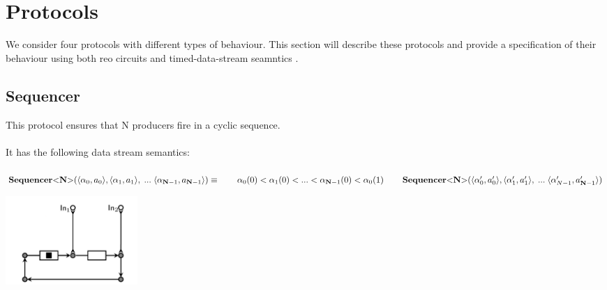 \section{Protocols} \label{sec:protocols}
We consider four protocols with different types of behaviour. This section will describe these protocols and provide a specification of their behaviour using both reo circuits \cite{puff} and timed-data-stream seamntics \cite{datastream}.

\subsection{Sequencer}%
\begin{minipage}{.65\textwidth}
  This protocol ensures that N producers fire in a cyclic sequence.\\\\
  It has the following data stream semantics:\\\\
  $
  \vspace{0.2cm}\sequencer (\langle \alpha_0, a_0 \rangle, \langle \alpha_1, a_1 \rangle,\;...\; \langle \alpha_{\textbf{N}-1}, a_{\textbf{N}-1} \rangle) \equiv \\
  \vspace{0.2cm}\hphantom \qquad  \alpha_0(0) < \alpha_1(0) < ... < \alpha_{\textbf{N}-1}(0) < \alpha_0(1) \\
  \hphantom \qquad \sequencer(\langle \alpha_0', a_0' \rangle, \langle \alpha_1', a_1' \rangle,\;...\; \langle \alpha_{N-1}', a_{\textbf{N}-1}' \rangle)
  $
\end{minipage}\hfill
\begin{minipage}{.25\textwidth}
  \includegraphics[width=5cm]{img/seq.png}
\end{minipage}

